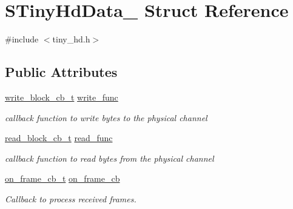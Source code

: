 \hypertarget{structSTinyHdData__}{}\section{S\+Tiny\+Hd\+Data\+\_\+ Struct Reference}
\label{structSTinyHdData__}


{\ttfamily \#include $<$tiny\+\_\+hd.\+h$>$}

\subsection*{Public Attributes}
\begin{DoxyCompactItemize}
\item 
\mbox{\label{structSTinyHdData___a38e79c64fc438348421c3dac60349cbe}} 
\hyperlink{tiny__proto__types_8h_aafd634660bba76cace57a8f9b01e044d}{write\+\_\+block\+\_\+cb\+\_\+t} \hyperlink{structSTinyHdData___a38e79c64fc438348421c3dac60349cbe}{write\+\_\+func}
\begin{DoxyCompactList}\small\item\em callback function to write bytes to the physical channel \end{DoxyCompactList}\item 
\mbox{\label{structSTinyHdData___a788bb96f41bfd7bdb6ce62e5fd018632}} 
\hyperlink{tiny__proto__types_8h_a15bec127d9ee63658563d62e92b5261b}{read\+\_\+block\+\_\+cb\+\_\+t} \hyperlink{structSTinyHdData___a788bb96f41bfd7bdb6ce62e5fd018632}{read\+\_\+func}
\begin{DoxyCompactList}\small\item\em callback function to read bytes from the physical channel \end{DoxyCompactList}\item 
\mbox{\label{structSTinyHdData___abf8a0eb5006769a92adc186554a3a1c0}} 
\hyperlink{tiny__proto__types_8h_ad6bf709565b8aecb9e6ecf196f219d54}{on\+\_\+frame\+\_\+cb\+\_\+t} \hyperlink{structSTinyHdData___abf8a0eb5006769a92adc186554a3a1c0}{on\+\_\+frame\+\_\+cb}
\begin{DoxyCompactList}\small\item\em Callback to process received frames. \end{DoxyCompactList}\item 
\mbox{\label{structSTinyHdData___a7ca4e5b23cf480d93317245010bcbe73}} 

\end{DoxyCompactItemize}
